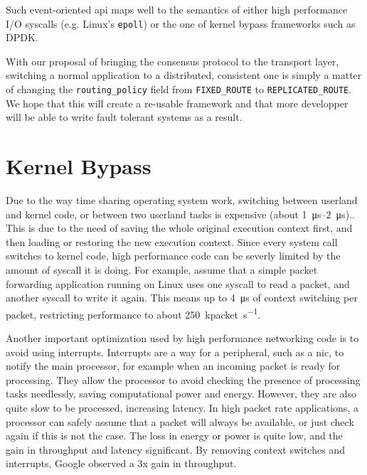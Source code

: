 Such event-oriented \gls{api} maps well to the semantics of either high performance I/O syscalls (e.g. Linux's \texttt{epoll}) or the one of kernel bypass frameworks such as DPDK.

\begin{lstfloat}

\end{lstfloat}

\begin{lstfloat}

\end{lstfloat}

With our proposal of bringing the consensus protocol to the transport layer, switching a normal application to a distributed, consistent one is simply a matter of changing the \texttt{routing\_policy} field from \texttt{FIXED\_ROUTE} to \texttt{REPLICATED\_ROUTE}.
We hope that this will create a re-usable framework and that more developper will be able to write fault tolerant systems as a result.

\section{Kernel Bypass}

Due to the way time sharing operating system work, switching between userland and kernel code, or between two userland tasks is expensive (about \SIrange{1}{2}{\micro\second}\cite{measuring_context_switch})..
This is due to the need of saving the whole original execution context first, and then loading or restoring the new execution context.
Since every system call switches to kernel code, high performance code can be severly limited by the amount of syscall it is doing.
For example, assume that a simple packet forwarding application running on Linux uses one syscall to read a packet, and another syscall to write it again.
This means up to \SI{4}{\micro\second} of context switching per packet, restricting performance to about \SI{250}{\kilo packet\per\second}.

Another important optimization used by high performance networking code is to avoid using interrupts.
Interrupts are a way for a peripheral, such as a \gls{nic}, to notify the main processor, for example when an incoming packet is ready for processing.
They allow the processor to avoid checking the presence of processing tasks needlessly, saving computational power and energy.
However, they are also quite slow to be processed, increasing latency.
In high packet rate applications, a processor can safely assume that a packet will always be available, or just check again if this is not the case.
The loss in energy or power is quite low, and the gain in throughput and latency significant.
By removing context switches and interrupts, Google observed a 3x gain in throughput\cite{maglev}.


